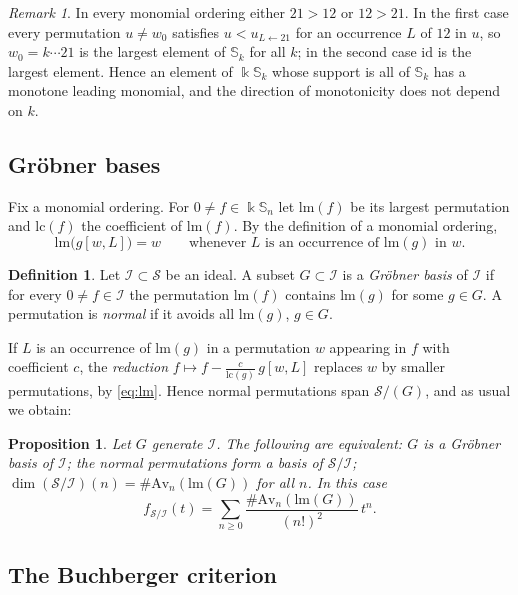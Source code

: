 \documentclass[11pt]{amsart}
\newtheorem{proposition}[theorem]{Proposition}
\theoremstyle{definition}
\newtheorem{definition}[theorem]{Definition}
\theoremstyle{remark}
\newtheorem{remark}[theorem]{Remark}
\newcommand{\bS}{\mathbb{S}}
\newcommand{\kk}{\Bbbk}
\newcommand{\lm}{\mathrm{lm}}
\newcommand{\lc}{\mathrm{lc}}
\newcommand{\cI}{\mathscr{I}}
\newcommand{\cS}{\mathscr{S}}
\newcommand{\Av}{\mathrm{Av}}
\newcommand{\id}{\mathrm{id}}
\begin{document}
\begin{remark}\label{rem:monotone}
In every monomial ordering either $21>12$ or $12>21$. In the first case every permutation $u\ne w_0$ satisfies $u<u_{L\leftarrow 21}$ for an occurrence $L$ of $12$ in $u$, so $w_0=k\cdots21$ is the largest element of $\bS_k$ for all $k$; in the second case $\id$ is the largest element. Hence an element of $\kk\bS_k$ whose support is all of $\bS_k$ has a monotone leading monomial, and the direction of monotonicity does not depend on $k$.
\end{remark}

\subsection{Gr\"obner bases}

Fix a monomial ordering. For $0\ne f\in\kk\bS_n$ let $\lm(f)$ be its largest permutation and $\lc(f)$ the coefficient of $\lm(f)$. By the definition of a monomial ordering,
\begin{equation}\label{eq:lm}
\lm\bigl(g[w,L]\bigr)=w\qquad\text{whenever } L \text{ is an occurrence of } \lm(g) \text{ in } w .
\end{equation}

\begin{definition}
Let $\cI\subset\cS$ be an ideal. A subset $G\subset\cI$ is a \emph{Gr\"obner basis} of $\cI$ if for every $0\ne f\in\cI$ the permutation $\lm(f)$ contains $\lm(g)$ for some $g\in G$. A permutation is \emph{normal} if it avoids all $\lm(g)$, $g\in G$.
\end{definition}

If $L$ is an occurrence of $\lm(g)$ in a permutation $w$ appearing in $f$ with coefficient $c$, the \emph{reduction} $f\mapsto f-\frac{c}{\lc(g)}\,g[w,L]$ replaces $w$ by smaller permutations, by \eqref{eq:lm}. Hence normal permutations span $\cS/(G)$, and as usual we obtain:

\begin{proposition}\label{prop:GB-dim}
Let $G$ generate $\cI$. The following are equivalent: $G$ is a Gr\"obner basis of $\cI$; the normal permutations form a basis of $\cS/\cI$; $\dim(\cS/\cI)(n)=\#\Av_n(\lm(G))$ for all $n$. In this case
\[
f_{\cS/\cI}(t)=\sum_{n\ge0}\frac{\#\Av_n(\lm(G))}{(n!)^2}\,t^n .
\]
\end{proposition}

\subsection{The Buchberger criterion}
\end{document}
